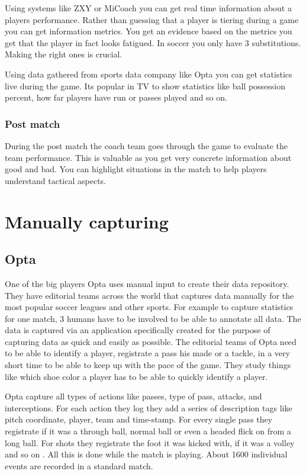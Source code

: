 Using systems like ZXY or MiCoach you can get real time information about a players performance. Rather than guessing that a player is tiering during a game you can get information metrics. You get an evidence based on the metrics you get that the player in fact looks fatigued. In soccer you only have 3 substitutions. Making the right ones is crucial.

Using data gathered from sports data company like Opta you can get statistics live during the game. Its popular in TV to show statistics like ball possession percent, how far players have run or passes played and so on. 

\subsubsection{Post match}

During the post match the coach team goes through the game to evaluate the team performance. This is valuable as you get very concrete information about good and bad. You can highlight situations in the match to help players understand tactical aspects.

\section{Manually capturing }

\subsection{Opta }


One of the big players Opta uses manual input to create their data repository. They have editorial teams across the world that captures data manually for the most popular soccer leagues and other sports. For example to capture statistics for one match, 3 humans have to be involved to be able to annotate all data. The data is captured via an application specifically created for the purpose of capturing data as quick and easily as possible. The editorial teams of Opta need to be able to identify a player, registrate a pass his made or a tackle, in a very short time to be able to keep up with the pace of the game. They study things like which shoe color a player has to be able to quickly identify a player.

Opta capture all types of actions like passes, type of pass, attacks, and interceptions. For each action they log they add a series of description tags like pitch coordinate, player, team and time-stamp. For every single pass they registrate if it was a through ball, normal ball or even a headed flick on from a long ball. For shots they registrate the foot it was kicked with, if it was a volley and so on . All this is done while the match is playing. About 1600 individual events are recorded in a standard match. 

